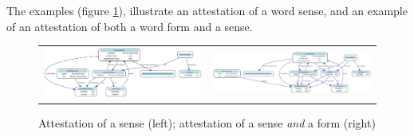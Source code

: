 \documentclass[10pt]{article}
\begin{document}
The examples (figure \ref{fig:ex2}), illustrate an attestation of a word sense, and an example of an attestation of both a word form and a sense.\par





 
 \begin{figure}
 \begin{tabular}{cc}
     	\includegraphics[width=\textheight, angle=90]{./example_1.pdf}  &  
     	\includegraphics[width=\textheight, angle=90]{./example_2.pdf}
 \end{tabular}

\caption{Attestation of a sense (left); attestation of a sense \textit{and} a form (right) }
\label{fig:ex2}
 \end{figure}









\end{document}
